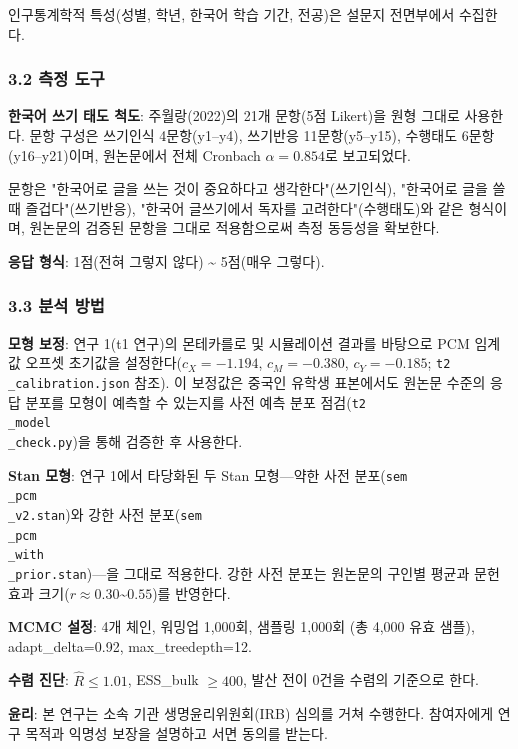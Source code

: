 \documentclass[a4paper,10pt]{oblivoir}
\begin{document}
인구통계학적 특성(성별, 학년, 한국어 학습 기간, 전공)은 설문지 전면부에서 수집한다.

\subsubsection{3.2 측정 도구}

\textbf{한국어 쓰기 태도 척도}: 주월랑(2022)의 21개 문항(5점 Likert)을 원형 그대로 사용한다. 문항 구성은 쓰기인식 4문항(y1–y4), 쓰기반응 11문항(y5–y15), 수행태도 6문항(y16–y21)이며, 원논문에서 전체 Cronbach $\alpha = 0.854$로 보고되었다.

문항은 "한국어로 글을 쓰는 것이 중요하다고 생각한다"(쓰기인식), "한국어로 글을 쓸 때 즐겁다"(쓰기반응), "한국어 글쓰기에서 독자를 고려한다"(수행태도)와 같은 형식이며, 원논문의 검증된 문항을 그대로 적용함으로써 측정 동등성을 확보한다.

\textbf{응답 형식}: 1점(전혀 그렇지 않다) \~{} 5점(매우 그렇다).

\subsubsection{3.3 분석 방법}

\textbf{모형 보정}: 연구 1(t1 연구)의 몬테카를로 및 시뮬레이션 결과를 바탕으로 PCM 임계값 오프셋 초기값을 설정한다($c_X=-1.194$, $c_M=-0.380$, $c_Y=-0.185$; \texttt{t2\\_calibration.json} 참조). 이 보정값은 중국인 유학생 표본에서도 원논문 수준의 응답 분포를 모형이 예측할 수 있는지를 사전 예측 분포 점검(\texttt{t2\\_model\\_check.py})을 통해 검증한 후 사용한다.

\textbf{Stan 모형}: 연구 1에서 타당화된 두 Stan 모형—약한 사전 분포(\texttt{sem\\_pcm\\_v2.stan})와 강한 사전 분포(\texttt{sem\\_pcm\\_with\\_prior.stan})—을 그대로 적용한다. 강한 사전 분포는 원논문의 구인별 평균과 문헌 효과 크기($r \approx 0.30$\~{}$0.55$)를 반영한다.

\textbf{MCMC 설정}: 4개 체인, 워밍업 1,000회, 샘플링 1,000회 (총 4,000 유효 샘플), adapt\_delta=0.92, max\_treedepth=12.

\textbf{수렴 진단}: $\hat{R} \leq 1.01$, ESS\_bulk $\geq 400$, 발산 전이 0건을 수렴의 기준으로 한다.

\textbf{윤리}: 본 연구는 소속 기관 생명윤리위원회(IRB) 심의를 거쳐 수행한다. 참여자에게 연구 목적과 익명성 보장을 설명하고 서면 동의를 받는다.
\end{document}
